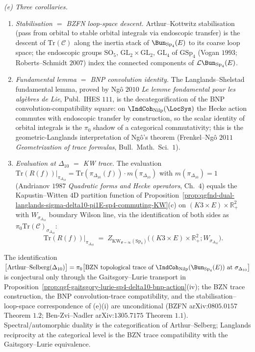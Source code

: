 \begin{proposition}
\emph{(e) Three corollaries.}
\begin{enumerate}
 \item[\textup{(i)}] \emph{Stabilisation $=$ BZFN loop-space
 descent.} Arthur--Kottwitz stabilisation (pass from orbital to
 stable orbital integrals via endoscopic transfer) is the descent
 of $\mathrm{Tr}(\mathcal C)$ along the inertia stack of
 $\Bun_{\mathrm{Sp}_4}(E)$ to its coarse loop space; the
 endoscopic groups $\mathrm{SO}_5$, $\mathrm{GL}_2\times\mathrm{GL}_2$,
 $\mathrm{GL}_4$ of $\mathrm{GSp}_4$ (Vogan $1993$; Roberts--Schmidt
 $2007$) index the connected components of
 $\mathcal L\Bun_{\mathrm{Sp}_4}(E)$.
 \item[\textup{(ii)}] \emph{Fundamental lemma $=$ BNP convolution
 identity.} The Langlands--Shelstad fundamental lemma, proved by
 Ng\^o $2010$ \emph{Le lemme fondamental pour les alg\`ebres de Lie},
 Publ.\ IHES $111$, is the decategorification of the BNP
 convolution-compatibility square: on
 $\IndCoh_{\mathrm{Nilp}}(\LocSys)$ the Hecke action commutes with
 endoscopic transfer by construction, so the scalar identity of
 orbital integrals is the $\pi_0$ shadow of a categorical
 commutativity; this is the geometric-Langlands interpretation of
 Ng\^o's theorem (Frenkel--Ng\^o $2011$ \emph{Geometrization of trace
 formulas}, Bull.\ Math.\ Sci.\ $1$).
 \item[\textup{(iii)}] \emph{Evaluation at $\Delta_{10}$ $=$ KW
 trace.} The evaluation
 $\mathrm{Tr}(R(f))|_{\pi_{\Delta_{10}}}=\mathrm{Tr}(\pi_{\Delta_{10}}(f))\cdot
 m(\pi_{\Delta_{10}})$ with $m(\pi_{\Delta_{10}})=1$ (Andrianov
 $1987$ \emph{Quadratic forms and Hecke operators}, Ch.\ $4$) equals
 the Kapustin--Witten $4$D partition function of
 Proposition~\ref{prop:qgfnd-dual-langlands-sigma-delta10-pi1E-sp4-commuting-KW}(c)
 on $(K3\times E)\times\mathbb R_+^2$ with
 $W_{\sigma_{\Delta_{10}}}$ boundary Wilson line, via the
 identification of both sides as $\pi_0\mathrm{Tr}(\mathcal C)_{\sigma_{\Delta_{10}}}$:
 \[
 \mathrm{Tr}(R(f))\big|_{\pi_{\Delta_{10}}}
 \;=\;Z_{\mathrm{KW}_{\Psi=\infty}(\mathrm{Sp}_4)}\bigl((K3\times E)\times\mathbb R_+^2;W_{\sigma_{\Delta_{10}}}\bigr).
 \]
\end{enumerate}

The identification
$\bigl[\text{Arthur--Selberg}(\Delta_{10})\bigr]
=\pi_0\bigl[\text{BZN topological trace of
}\IndCoh_{\mathrm{Nilp}}(\Bun_{\mathrm{Sp}_4}(E))\text{ at
}\sigma_{\Delta_{10}}\bigr]$ is conjectural only through the
Gaitsgory--Lurie transport in
Proposition~\ref{prop:qgf-gaitsgory-lurie-sp4-delta10-bnp-action}(iv);
the BZN trace construction,
the BNP convolution-trace compatibility, and the stabilisation--loop-space
correspondence of (e)(i) are unconditional (BZFN arXiv:$0805.0157$
Theorem $1.2$; Ben-Zvi--Nadler arXiv:$1305.7175$ Theorem $1.1$).
Spectral/automorphic duality is the categorification of
Arthur--Selberg; Langlands reciprocity at the categorical level is
the BZN trace compatibility with the Gaitsgory--Lurie equivalence.
\end{proposition}

